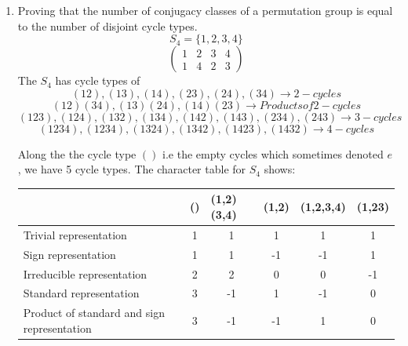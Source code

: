 \documentclass[12pt]{article}
\begin{document}
\begin{enumerate}
\item Proving that the number of conjugacy classes of a permutation group is equal to the number of disjoint cycle types. 
$$ S_4 = \{ 1,2,3,4\} $$
$$  \left( \begin{array}{cccccc} 1 & 2 & 3 & 4 \\ 1 & 4 & 2 & 3 \end{array}\right) $$
The $S_4$ has cycle types of 
$$ (12), (13), (14), (23), (24), (34) \rightarrow 2-cycles $$
$$ (12)(34), (13)(24), (14)(23) \rightarrow Products of 2-cycles$$
$$ (123), (124), (132), (134), (142), (143), (234), (243) \rightarrow 3-cycles $$
$$ (1234), (1234), (1324), (1342), (1423), (1432) \rightarrow 4-cycles $$

Along the the cycle type $()$ i.e the empty cycles which sometimes denoted $e$, we have 5 cycle types. The character table for $S_4$ shows:
\begin{table}[h]
    \centering
    \begin{tabular}{lccccc}
                                                                      & \multicolumn{1}{l}{()} & \multicolumn{1}{l}{(1,2)(3,4)} & \multicolumn{1}{l}{(1,2)} & \multicolumn{1}{l}{(1,2,3,4)} & \multicolumn{1}{l}{(1,23)} \\ \hline
    \multicolumn{1}{|l|}{Trivial representation}                      & \multicolumn{1}{c|}{1} & \multicolumn{1}{c|}{1}         & \multicolumn{1}{c|}{1}    & \multicolumn{1}{c|}{1}        & \multicolumn{1}{c|}{1}     \\ \hline
    \multicolumn{1}{|l|}{Sign representation}                         & \multicolumn{1}{c|}{1} & \multicolumn{1}{c|}{1}         & \multicolumn{1}{c|}{-1}   & \multicolumn{1}{c|}{-1}       & \multicolumn{1}{c|}{1}     \\ \hline
    \multicolumn{1}{|l|}{Irreducible representation}                  & \multicolumn{1}{c|}{2} & \multicolumn{1}{c|}{2}         & \multicolumn{1}{c|}{0}    & \multicolumn{1}{c|}{0}        & \multicolumn{1}{c|}{-1}    \\ \hline
    \multicolumn{1}{|l|}{Standard representation}                     & \multicolumn{1}{c|}{3} & \multicolumn{1}{c|}{-1}        & \multicolumn{1}{c|}{1}    & \multicolumn{1}{c|}{-1}       & \multicolumn{1}{c|}{0}     \\ \hline
    \multicolumn{1}{|l|}{Product of standard and sign representation} & \multicolumn{1}{c|}{3} & \multicolumn{1}{c|}{-1}        & \multicolumn{1}{c|}{-1}   & \multicolumn{1}{c|}{1}        & \multicolumn{1}{c|}{0}     \\ \hline

\end{tabular}
\end{table}
\end{enumerate}
\end{document}
